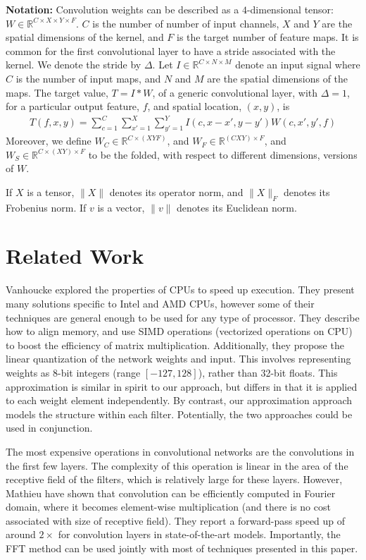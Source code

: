  \noindent \textbf{Notation:} Convolution weights can be described as
 a $4$-dimensional tensor: $W \in \mathbb{R}^{C \times X \times Y
   \times F}$. $C$ is the number of number of input channels, $X$ and
 $Y$ are the spatial dimensions of the kernel, and $F$ is the target
 number of feature maps. 
 It is common for the first convolutional layer to have a stride associated with the kernel. 
 We denote the stride by $\Delta$.  Let $I \in \mathbb{R}^{C \times N \times M}$
 denote an input signal where $C$ is the number of input maps, and $N$
 and $M$ are the spatial dimensions of the maps.  The target value, $T
 = I \ast W$, of a generic convolutional layer, with $\Delta = 1$, for a particular output
 feature, $f$, and spatial location, $(x, y)$, is
\begin{align*}
\label{convlayereq}
T(f,x,y) = \sum_{c=1}^C \sum_{x'=1}^{X} \sum_{y'=1}^{Y} I(c,x-x',y-y') W(c,x',y',f)
\end{align*}
Moreover, we define $W_C \in \mathbb{R}^{C \times (XYF)}$, and $W_F \in \mathbb{R}^{(CXY) \times F}$, 
and $W_S \in \mathbb{R}^{C \times (XY) \times F}$ to be the folded, with respect to different dimensions, versions of $W$.

If $X$ is a tensor, $\|X \|$ denotes its operator norm, and $\|X \|_F$ denotes its Frobenius norm.
If $v$ is a vector, $\|v \|$ denotes its Euclidean norm.

\section{Related Work}
\label{relwork}

Vanhoucke \etal \cite{vanhoucke2011improving} explored the
properties of CPUs to speed up execution.  They present many solutions
specific to Intel and AMD CPUs, however some of their techniques are
general enough to be used for any type of processor.  They describe
how to align memory, and use SIMD operations (vectorized operations on
CPU) to boost the efficiency of matrix multiplication.  Additionally, they
propose the linear quantization of the network weights and input. This
involves representing weights as 8-bit integers (range
$[-127, 128]$), rather than 32-bit floats. This approximation is
similar in spirit to our approach, but differs in that it is applied
to each weight element independently. By contrast, our approximation approach models
the structure within each filter. Potentially, the two approaches
could be used in conjunction. 

The most expensive operations in convolutional networks are the
convolutions in the first few layers. The complexity of this operation
is linear in the area of the receptive field of the filters, which is
relatively large for these layers.  However, Mathieu \etal \cite{mathieu2013fast} have shown that convolution can be
efficiently computed in Fourier domain, where it becomes element-wise
multiplication (and there is no cost associated with size of receptive
field). They report a forward-pass speed up of around $2\times$ for
convolution layers in state-of-the-art models. Importantly, the FFT method can
be used jointly with most of techniques presented in this paper.

